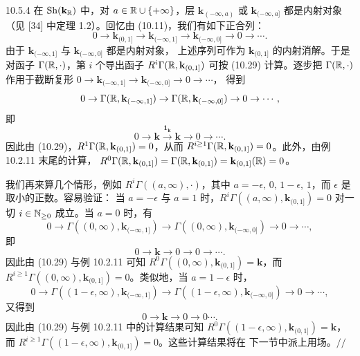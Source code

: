 \begin{wexam}{10.5.4}
在 $\operatorname{Sh}(\mathbf{k}_{\mathbb{R}})$ 中，对 $a\in\mathbb{R}\cup\{+\infty\}$，层
$\mathbf{k}_{(-\infty,a)}$ 或 $\mathbf{k}_{(-\infty,a]}$ 都是内射对象（见
[34] 中定理 1.2）。回忆由 (10.11)，我们有如下正合列：
\begin{equation}\tag{10.30}
  0\to\mathbf{k}_{(0,1]}\to\mathbf{k}_{(-\infty,1]}
  \to\mathbf{k}_{(-\infty,0]}\to0\to\cdots .
\end{equation}
由于 $\mathbf{k}_{(-\infty,1]}$ 与 $\mathbf{k}_{(-\infty,0]}$ 都是内射对象，
上述序列可作为 $\mathbf{k}_{(0,1]}$ 的内射消解。于是对函子
$\Gamma(\mathbb{R},\cdot)$，第 $i$ 个导出函子
$R^i\Gamma(\mathbb{R},\mathbf{k}_{(0,1]})$ 可按 (10.29) 计算。逐步把
$\Gamma(\mathbb{R},\cdot)$ 作用于截断复形
$0\to\mathbf{k}_{(-\infty,1]}\to\mathbf{k}_{(-\infty,0]}\to0\to\cdots$，
得到
\[
  0\to\Gamma(\mathbb{R},\mathbf{k}_{(-\infty,1]})
  \to\Gamma(\mathbb{R},\mathbf{k}_{(-\infty,0]})\to0\to\cdots,
\]
即
\[
  0\to\mathbf{k}\xrightarrow{\mathbf{1}_{\mathbf{k}}}\mathbf{k}
  \to0\to\cdots .
\]
因此由 (10.29)，$R^1\Gamma(\mathbb{R},\mathbf{k}_{(0,1]})=0$，从而
$R^{i\ge1}\Gamma(\mathbb{R},\mathbf{k}_{(0,1]})=0$。此外，由例 10.2.11 末尾的计算，
$R^0\Gamma(\mathbb{R},\mathbf{k}_{(0,1]})=\Gamma(\mathbb{R},\mathbf{k}_{(0,1]})
=\mathbf{k}_{(0,1]}(\mathbb{R})=0$。

我们再来算几个情形，例如 $R^i\Gamma((a,\infty),\cdot)$，其中
$a=-\epsilon,\,0,\,1-\epsilon,\,1$，而 $\epsilon$ 是取小的正数。容易验证：
当 $a=-\epsilon$ 与 $a=1$ 时，$R^i\Gamma((a,\infty),\mathbf{k}_{(0,1]})=0$
对一切 $i\in\mathbb{N}_{\ge0}$ 成立。当 $a=0$ 时，有
\[
  0\to\Gamma((0,\infty),\mathbf{k}_{(-\infty,1]})
  \to\Gamma((0,\infty),\mathbf{k}_{(-\infty,0]})\to0\to\cdots,
\]
即
\[
  0\to\mathbf{k}\to0\to0\to\cdots .
\]
因此由 (10.29) 与例 10.2.11 可知
$R^0\Gamma((0,\infty),\mathbf{k}_{(0,1]})=\mathbf{k}$，而
$R^{i\ge1}\Gamma((0,\infty),\mathbf{k}_{(0,1]})=0$。类似地，当
$a=1-\epsilon$ 时，
\[
  0\to\Gamma((1-\epsilon,\infty),\mathbf{k}_{(-\infty,1]})
  \to\Gamma((1-\epsilon,\infty),\mathbf{k}_{(-\infty,0]})\to0\to\cdots,
\]
又得到
\[
  0\to\mathbf{k}\to0\to0\cdots .
\]
因此由 (10.29) 与例 10.2.11 中的计算结果可知
$R^0\Gamma((1-\epsilon,\infty),\mathbf{k}_{(0,1]})=\mathbf{k}$，而
$R^{i\ge1}\Gamma((1-\epsilon,\infty),\mathbf{k}_{(0,1]})=0$。这些计算结果将在
下一节中派上用场。\hfill$//$
\end{wexam}


